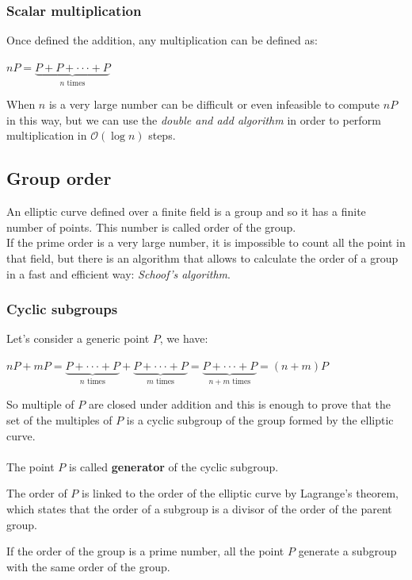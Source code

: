 \subsubsection{Scalar multiplication}
Once defined the addition, any multiplication can be defined as:
\begin{center} 
	$ nP=\underbrace{
		P+P+\cdot \cdot \cdot+P
	}_{n\text{ times}}$
\end{center}
When $n$ is a very large number can be difficult or even infeasible to compute $nP$ in this way, but we can use the \textit{double and add algorithm} in order to perform multiplication in $\mathcal{O}(\log{}n)$ steps.

\subsection{Group order}
An elliptic curve defined over a finite field is a group and so it has a finite number of points. This number is called order of the group.\\
If the prime order is a very large number, it is impossible to count all the point in that field, but there is an algorithm that allows to calculate the order of a group in a fast and efficient way: \textit{Schoof's algorithm}.

\subsubsection{Cyclic subgroups}
Let's consider a generic point $P$, we have:
\begin{center} 
	$ nP+mP=\underbrace{
		P+\cdot \cdot \cdot+P
	}_{n\text{ times}}+
		\underbrace{
		P+\cdot \cdot \cdot+P
	}_{m\text{ times}}=
	\underbrace{
		P+\cdot \cdot \cdot+P
	}_{n+m\text{ times}} = 
	(n+m)P$
\end{center}
So multiple of $P$ are closed under addition and this is enough to prove that the set of the multiples of $P$ is a cyclic subgroup of the group formed by the elliptic curve.
\\ \\
The point $P$ is called \textbf{generator} of the cyclic subgroup.

\begin{remark}
	The order of $P$ is linked to the order of the elliptic curve by Lagrange's theorem, which states that the order of a subgroup is a divisor of the order of the parent group.
\end{remark}

\begin{remark}
	If the order of the group is a prime number, all the point $P$ generate a subgroup with the same order of the group.
\end{remark}



